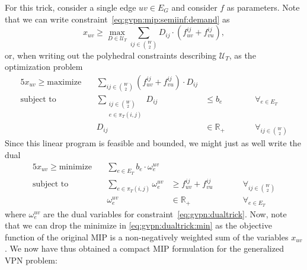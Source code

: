 For this trick, consider a single edge $uv \in E_G$ and consider $f$ as parameters.
Note that we can write constraint~\eqref{eq:gvpn:mip:semiinf:demand} as
\[
    x_{uv} \ge \max_{D \in \mathcal U_T} \sum_{ij \in \binom W 2} D_{ij} \cdot (f^{ij}_{uv} + f^{ij}_{vu}),
\]
or, when writing out the polyhedral constraints describing $\mathcal U_T$, as the optimization problem
\begin{alignat}{5}
    x_{uv} \ge \text{maximize}\ && \sum_{ij \in \binom{W}{2}} (f_{uv}^{ij} + f_{vu}^{ij}) \cdot D_{ij} &&& \\
    \text{subject to}\ && \sum_{\substack{ij \in \binom{W}{2}\\e \in \pi_T(i,j)}} D_{ij} &\le b_e &&\qquad \forall_{e \in E_T} \label{eq:gvpn:dualtrick} \\
    && D_{ij} &\in \mathbb{R}_+ &&\qquad \forall_{ij \in \binom{W}{2}}
\end{alignat}
Since this linear program is feasible and bounded, we might just as well write the dual
\begin{alignat}{5}
    x_{uv} \ge \text{minimize}\ && \sum_{e \in E_T} b_e \cdot \omega_e^{uv} &&& \label{eq:gvpn:dualtrick:min} \\
    \text{subject to}\ && \sum_{e \in \pi_T(i,j)} \omega_e^{uv} &\ge f_{uv}^{ij} + f_{vu}^{ij} &&\qquad \forall_{ij \in \binom{W}{2}} \\
    && \omega_e^{uv} &\in \mathbb{R}_+ &&\qquad \forall_{e \in E_T}
\end{alignat}
where $\omega_e^{uv}$ are the  dual variables for constraint~\eqref{eq:gvpn:dualtrick}.
Now, note that we can drop the minimize in \eqref{eq:gvpn:dualtrick:min} as the objective function of the original MIP is a non-negatively weighted sum of the variables $x_{uv}$.
We now have thus obtained a compact MIP formulation for the generalized VPN problem:
